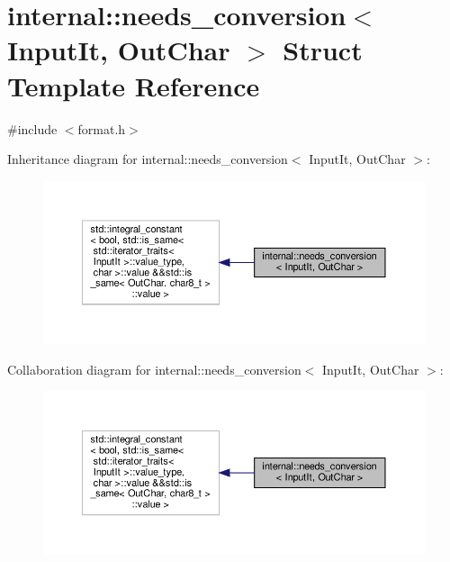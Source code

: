 \hypertarget{structinternal_1_1needs__conversion}{}\section{internal\+:\+:needs\+\_\+conversion$<$ Input\+It, Out\+Char $>$ Struct Template Reference}
\label{structinternal_1_1needs__conversion}


{\ttfamily \#include $<$format.\+h$>$}



Inheritance diagram for internal\+:\+:needs\+\_\+conversion$<$ Input\+It, Out\+Char $>$\+:
\nopagebreak
\begin{figure}[H]
\begin{center}
\leavevmode
\includegraphics[width=350pt]{structinternal_1_1needs__conversion__inherit__graph}
\end{center}
\end{figure}


Collaboration diagram for internal\+:\+:needs\+\_\+conversion$<$ Input\+It, Out\+Char $>$\+:
\nopagebreak
\begin{figure}[H]
\begin{center}
\leavevmode
\includegraphics[width=350pt]{structinternal_1_1needs__conversion__coll__graph}
\end{center}
\end{figure}


